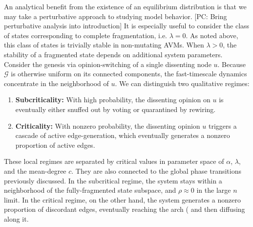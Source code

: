 \documentclass[review, onefignum, onetabnum]{siamart171218}
\newcommand{\pc}[1]{{\color{comment_purple}[PC: #1]}}
\begin{document}
			
		
	An analytical benefit from the existence of an equilibrium distribution is that we may take a perturbative approach to studying model behavior. \pc{Bring perturbative analysis into introduction}
	It is especially useful to consider the class of states corresponding to complete fragmentation, i.e. $\lambda = 0$. 
	As noted above, this class of states is trivially stable in non-mutating AVMs. 
	When $\lambda > 0$, the stability of a fragmented state depends on additional system parameters. 
	Consider the genesis via opinion-switching of a single dissenting node $u$. 
	Because $\mathcal{G}$ is otherwise uniform on its connected components, the fast-timescale dynamics concentrate in the neighborhood of $u$. 
	We can distinguish two qualitative regimes: 
	\begin{enumerate}
		\item \textbf{Subcriticality:} With high probability, the dissenting opinion on $u$ is eventually either snuffed out by voting or quarantined by rewiring. 
		\item \textbf{Criticality:} With nonzero probability, the dissenting opinion $u$ triggers a cascade of active edge-generation, which eventually generates a nonzero proportion of active edges. 
	\end{enumerate}
	These local regimes are separated by critical values in parameter space of $\alpha$, $\lambda$, and the mean-degree $c$. 
	They are also connected to the global phase transitions previously discussed. 
	In the subcritical regime, the system stays within a neighborhood of the fully-fragmented state subspace, and $\rho \approx 0$ in the large $n$ limit. 
	In the critical regime, on the other hand, the system generates a nonzero proportion of discordant edges, eventually reaching the arch ( and then diffusing along it. 
	
\end{document}
